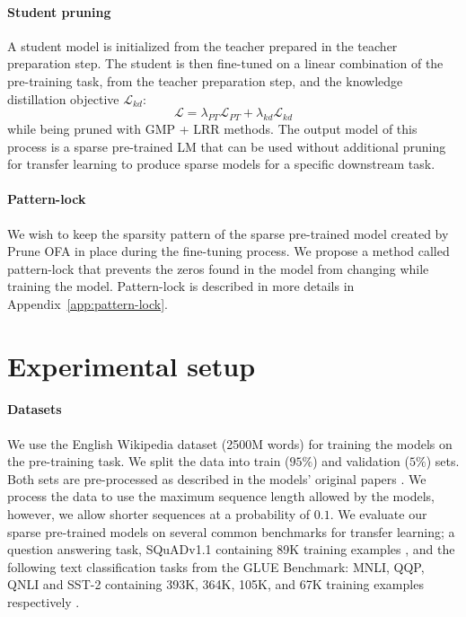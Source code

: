 \documentclass{article}
\begin{document}
\paragraph{Student pruning}
A student model is initialized from the teacher prepared in the teacher preparation step.
The student is then fine-tuned on a linear combination of the pre-training task, from the teacher preparation step, and the knowledge  distillation objective $\mathcal{L}_{kd}$:
\begin{equation}
    \mathcal{L} = \lambda_{PT} \mathcal{L}_{PT} + \lambda_{kd} \mathcal{L}_{kd}
\end{equation}
while being pruned with GMP + LRR methods.
The output model of this process is a sparse pre-trained LM that can be used without additional pruning for transfer learning to produce sparse models for a specific downstream task.

\paragraph{Pattern-lock}
\label{sec:method-transfer}
We wish to keep the sparsity pattern of the sparse pre-trained model created by Prune OFA in place during the fine-tuning process.
We propose a method called pattern-lock that prevents the zeros found in the model from changing while training the model.
Pattern-lock is described in more details in Appendix~\ref{app:pattern-lock}.

\section{Experimental setup}
\label{sec:exp-setup}

\paragraph{Datasets}
\label{sec:datasets}
We use the English Wikipedia dataset (2500M words) for training the models on the pre-training task.
We split the data into train ($95\%$) and validation ($5\%$) sets.
Both sets are pre-processed as described in the models' original papers \citep{devlin2018bert, sanh2019distilbert}.
We process the data to use the maximum sequence length allowed by the models, however, we allow shorter sequences at a probability of $0.1$.
We evaluate our sparse pre-trained models on several common benchmarks for transfer learning; a question answering task, SQuADv1.1 containing 89K training examples \citep{rajpurkar2016squad}, and the following text classification tasks from the GLUE Benchmark: MNLI, QQP, QNLI and SST-2 containing 393K, 364K, 105K, and 67K training examples respectively \citep{wang2018glue, williams2018mnli, iyer2017qqp, socher2013sst2}.
\end{document}
